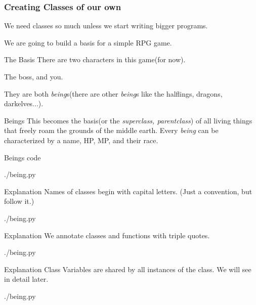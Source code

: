 \documentclass{beamer}
\begin{document}
\begin{frame}
\frametitle{Creating Classes of our own}
  We need classes so much unless we start writing bigger programs.

  We are going to build a basis for a simple RPG game.
\end{frame}

\begin{frame}{The Basis}
  There are two characters in this game(for now).

  The boss, and you.

  They are both \textit{being}s(there are other \textit{being}s like the halflings,
  dragons, darkelves...).
\end{frame}

\begin{frame}{Beings}
  This becomes the basis(or the \textit{superclass, parentclass}) of all living things that freely
  roam the grounds of the middle earth.  Every \textit{being} can be
  characterized by a name, HP, MP, and their race.
\end{frame}

\begin{frame}{Beings code}
  \begin{lstinputlisting}[firstline=1, lastline=23]
    {./being.py}
  \end{lstinputlisting}
\end{frame}

\begin{frame}{Explanation}
  Names of classes begin with capital letters. (Just a convention, but follow
  it.)
  \begin{lstinputlisting}[firstline=1, lastline=1]
    {./being.py}
  \end{lstinputlisting}
\end{frame}

\begin{frame}{Explanation}
  We annotate classes and functions with triple quotes.
  \begin{lstinputlisting}[firstline=1, lastline=2]
    {./being.py}
  \end{lstinputlisting}
\end{frame}

\begin{frame}{Explanation}
  Class Variables are shared by all instances of the class.
  We will see in detail later.
  \begin{lstinputlisting}[firstline=1, lastline=5]
    {./being.py}
  \end{lstinputlisting}
\end{frame}
\end{document}
